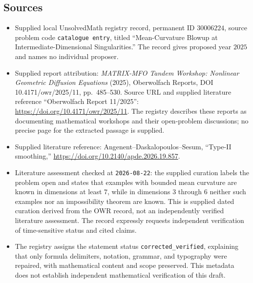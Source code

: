 \documentclass[11pt]{article}
\begin{document}
\subsection{Sources}
\begin{itemize}
\item Supplied local UnsolvedMath registry record, permanent ID \(30006224\), source problem code \texttt{catalogue entry}, titled ``Mean-Curvature Blowup at Intermediate-Dimensional Singularities.'' The record gives proposed year \(2025\) and names no individual proposer.
\item Supplied report attribution: \emph{MATRIX-MFO Tandem Workshop: Nonlinear Geometric Diffusion Equations} (2025), Oberwolfach Reports, DOI 10.4171/owr/2025/11, pp.\ 485--530. Source URL and supplied literature reference ``Oberwolfach Report 11/2025'': \url{https://doi.org/10.4171/owr/2025/11}. The registry describes these reports as documenting mathematical workshops and their open-problem discussions; no precise page for the extracted passage is supplied.
\item Supplied literature reference: Angenent--Daskalopoulos--Sesum, ``Type-II smoothing,'' \url{https://doi.org/10.2140/apde.2026.19.857}.
\item Literature assessment checked at \texttt{2026-08-22}: the supplied curation labels the problem open and states that examples with bounded mean curvature are known in dimensions at least \(7\), while in dimensions \(3\) through \(6\) neither such examples nor an impossibility theorem are known. This is supplied dated curation derived from the OWR record, not an independently verified literature assessment. The record expressly requests independent verification of time-sensitive status and cited claims.
\item The registry assigns the statement status \texttt{corrected\_verified}, explaining that only formula delimiters, notation, grammar, and typography were repaired, with mathematical content and scope preserved. This metadata does not establish independent mathematical verification of this draft.
\end{itemize}
\end{document}
